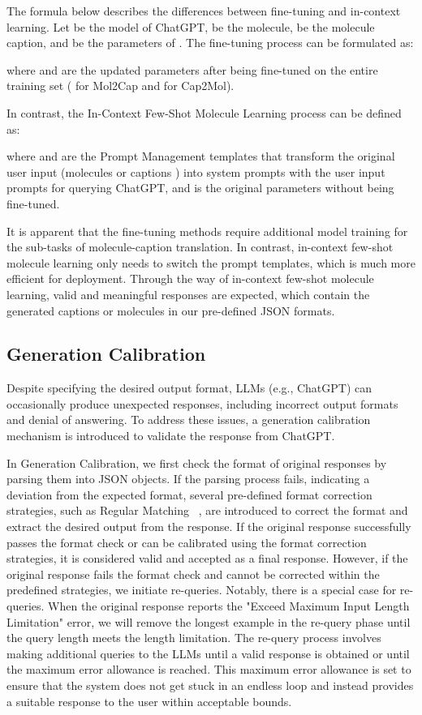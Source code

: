 \documentclass{article}
\theoremstyle{plain}
\theoremstyle{definition}
\theoremstyle{remark}
\begin{document}
The formula below describes the differences between fine-tuning and in-context learning. 
Let  be the model of ChatGPT,  be the molecule,  be the molecule caption, and  be the parameters of . The fine-tuning process can be formulated as: 

where  and  are the updated parameters after being fine-tuned on the entire training set ( for Mol2Cap and  for Cap2Mol).

In contrast, the In-Context Few-Shot Molecule Learning process can be defined as:


where  and  are the Prompt Management templates that transform the original user input (molecules  or captions ) into system prompts with the user input prompts for querying ChatGPT, and  is the original parameters without being fine-tuned.

It is apparent that the fine-tuning methods require additional model training for the sub-tasks of molecule-caption translation.
In contrast, in-context few-shot molecule learning only needs to switch the prompt templates, which is much more efficient for deployment. Through the way of in-context few-shot molecule learning, valid and meaningful responses are expected, which contain the generated captions or molecules in our pre-defined JSON formats.


\subsection{Generation Calibration}
Despite specifying the desired output format, LLMs (e.g., ChatGPT) can occasionally produce unexpected responses, including incorrect output formats and denial of answering. 
To address these issues, a generation calibration mechanism is introduced to validate the response from ChatGPT.

In Generation Calibration, we first check the format of original responses by parsing them into JSON objects.
If the parsing process fails, indicating a deviation from the expected format, 
several pre-defined format correction strategies, such as Regular Matching ~\cite{thompson1968programming}, are introduced to correct the format and extract the desired output from the response. 
If the original response successfully passes the format check or can be calibrated using the format correction strategies, it is considered valid and accepted as a final response. 
However, if the original response fails the format check and cannot be corrected within the predefined strategies, we initiate re-queries. 
Notably, there is a special case for re-queries. When the original response reports the "Exceed Maximum Input Length Limitation" error, we will remove the longest example in the re-query phase until the query length meets the length limitation.
The re-query process involves making additional queries to the LLMs until a valid response is obtained or until the maximum error allowance is reached. This maximum error allowance is set to ensure that the system does not get stuck in an endless loop and instead provides a suitable response to the user within acceptable bounds.
\end{document}

